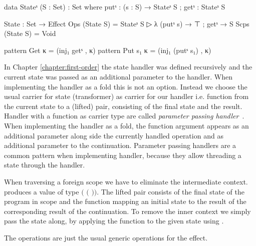 \begin{code}
data Stateˢ (S : Set) : Set where putˢ : (s : S) → Stateˢ S ; getˢ : Stateˢ S

State : Set → Effect
Ops   (State S) = Stateˢ S ▷ λ{ (putˢ s) → ⊤ ; getˢ → S }
Scps  (State S) = Void

pattern Get κ     = (inj₁ getˢ , κ)
pattern Put s₁ κ  = (inj₁ (putˢ s₁) , κ)
\end{code}
In Chapter \ref{chapter:first-order} the state handler was defined recursively
and the current state was passed as an additional parameter to the handler.
When implementing the handler as a fold this is not an option.
Instead we choose the usual carrier for state (transformer) as carrier for our handler i.e.
function from the current state to a (lifted) pair, consisting of the final
state and the result.
Handler with a function as carrier type are called \textit{parameter passing
  handler}~\cite{DBLP:conf/esop/PlotkinP09}.
When implementing the handler as a fold, the function argument appears as an
additional parameter along side the currently handled operation and as
additional parameter to the continuation.
Parameter passing handlers are a common pattern when implementing handler,
because they allow threading a state through the handler.

When traversing a foreign scope we have to eliminate the intermediate context.
 produces a value of type
\AgdaSpace{}\AgdaSpace{}$($%
\AgdaSpace{}\AgdaSpace{}$($%
\AgdaSpace{}\AgdaSpace{}%
\AgdaSpace{}\AgdaSpace{}$)$$)$.
The lifted pair consists of the final state of the program in scope and the
function mapping an initial state to the result of the corresponding result of
the continuation.
To remove the inner context we simply pass the state along, by applying the
function to the given state using .

The operations are just the usual generic operations for the effect.

